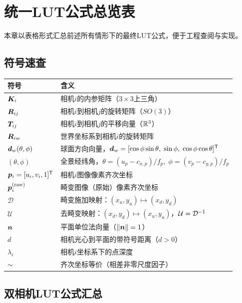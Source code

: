 \section{统一LUT公式总览表}
\label{sec:summary}

本章以表格形式汇总前述所有情形下的最终LUT公式，便于工程查阅与实现。

\subsection{符号速查}
\label{sec:notation-summary}

\begin{tabularx}{\textwidth}{lX}
\toprule
符号 & 含义 \\
\midrule
$\bm{K}_i$ & 相机$i$的内参矩阵（$3\times 3$上三角） \\
$\bm{R}_{ij}$ & 相机$i$到相机$j$的旋转矩阵（$SO(3)$） \\
$\bm{T}_{ij}$ & 相机$i$到相机$j$的平移向量（$\mathbb{R}^3$） \\
$\bm{R}_{iw}$ & 世界坐标系到相机$i$的旋转矩阵 \\
$\bm{d}_w(\theta,\phi)$ & 球面方向向量，$\bm{d}_w = [\cos\phi\sin\theta,\; \sin\phi,\; \cos\phi\cos\theta]^{\mathsf{T}}$ \\
$(\theta,\phi)$ & 全景经纬角，$\theta = (u_p-c_{x,p})/f_p,\; \phi = (v_p-c_{y,p})/f_p$ \\
$\bm{p}_i = [u_i,v_i,1]^{\mathsf{T}}$ & 相机$i$图像像素齐次坐标 \\
$\bm{p}_i^{\text{(raw)}}$ & 畸变图像（原始）像素齐次坐标 \\
$\mathcal{D}$ & 畸变施加映射：$(x_u,y_u) \mapsto (x_d,y_d)$ \\
$\mathcal{U}$ & 去畸变映射：$(x_d,y_d) \mapsto (x_u,y_u)$，$\mathcal{U} = \mathcal{D}^{-1}$ \\
$\bm{n}$ & 平面单位法向量（$\lVert\bm{n}\rVert=1$） \\
$d$ & 相机光心到平面的带符号距离（$d>0$） \\
$\lambda_i$ & 相机$i$坐标系下的点深度 \\
$\sim$ & 齐次坐标等价（相差非零尺度因子） \\
\bottomrule
\end{tabularx}

\subsection{双相机LUT公式汇总}
\label{sec:summary-dual}

